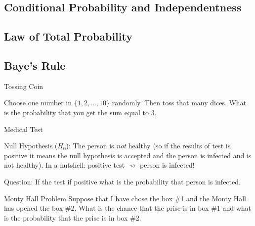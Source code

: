 \subsection{Conditional Probability and Independentness}


\subsection{Law of Total Probability}


\subsection{Baye's Rule}

\begin{example}{Tossing Coin}

Choose one number in $\{1,2,\ldots,10\}$ randomly. Then toss that many dices. What is the probability that you get the sum equal to 3.

\end{example}

\begin{example}{Medical Test}

Null Hypothesis ($H_0$): The person is \emph{not} healthy (so if the results of test is positive it means the null hypothesis is accepted and the person is infected and is not healthy). In a nutshell: positive test $\rightsquigarrow$ person is infected!

Question: If the test if positive what is the probability that person is infected.
\end{example}

\begin{example}{Monty Hall Problem}
Suppose that I have chose the box \#1 and the Monty Hall has opened the box \#2. What is the chance that the prise is in box \#1 and what is the probability that the prise is in box \#2. 
\end{example}
